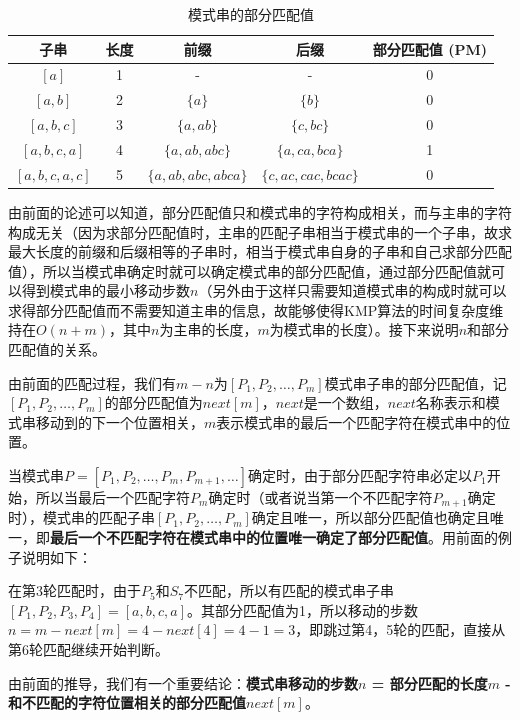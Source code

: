 \begin{table}[!htb]
    \centering
    \begin{tabular}{|c|c|c|c|c|}
        \hline
        子串 & 长度 & 前缀 & 后缀 & 部分匹配值 (PM) \\
        \hline
        $[a]$ & 1 & - & - & 0 \\
        $[a, b]$ & 2 & $\{a\}$ & $\{b\}$ & 0 \\ 
        $[a, b, c]$ & 3 & $\{a, ab\}$ & $\{c, bc\}$ & 0 \\
        $[a, b, c, a]$ & 4 & $\{a, ab, abc\}$ & $\{a, ca, bca\}$ & 1 \\
        $[a, b, c, a, c]$ & 5 & $\{a, ab, abc, abca\}$ & $\{c, ac, cac, bcac\}$ & 0 \\
        \hline
    \end{tabular}
    \caption{模式串的部分匹配值}
\end{table}

由前面的论述可以知道，部分匹配值只和模式串的字符构成相关，而与主串的字符构成无关（因为求部分匹配值时，主串的匹配子串相当于模式串的一个子串，故求最大长度的前缀和后缀相等的子串时，相当于模式串自身的子串和自己求部分匹配值），所以当模式串确定时就可以确定模式串的部分匹配值，通过部分匹配值就可以得到模式串的最小移动步数$n$（另外由于这样只需要知道模式串的构成时就可以求得部分匹配值而不需要知道主串的信息，故能够使得KMP算法的时间复杂度维持在$O(n + m)$，其中$n$为主串的长度，$m$为模式串的长度）。接下来说明$n$和部分匹配值的关系。

由前面的匹配过程，我们有$m - n$为$[P_1, P_2, \dots, P_m]$模式串子串的部分匹配值，记$[P_1, P_2, \dots, P_m]$的部分匹配值为$next[m]$，$next$是一个数组，$next$名称表示和模式串移动到的下一个位置相关，$m$表示模式串的最后一个匹配字符在模式串中的位置。

当模式串$P = [P_1, P_2, \dots, P_m, P_{m + 1}, \dots]$确定时，由于部分匹配字符串必定以$P_1$开始，所以当最后一个匹配字符$P_m$确定时（或者说当第一个不匹配字符$P_{m + 1}$确定时），模式串的匹配子串$[P_1, P_2, \dots, P_m]$确定且唯一，所以部分匹配值也确定且唯一，即\textbf{最后一个不匹配字符在模式串中的位置唯一确定了部分匹配值}。用前面的例子说明如下：

在第3轮匹配时，由于$P_5$和$S_7$不匹配，所以有匹配的模式串子串$[P_1, P_2, P_3, P_4] = [a, b, c, a]$。其部分匹配值为1，所以移动的步数$n = m - next[m] = 4 - next[4] = 4 - 1 = 3$，即跳过第4，5轮的匹配，直接从第6轮匹配继续开始判断。

由前面的推导，我们有一个重要结论：\textbf{模式串移动的步数$n$ = 部分匹配的长度$m$ - 和不匹配的字符位置相关的部分匹配值$next[m]$}。

